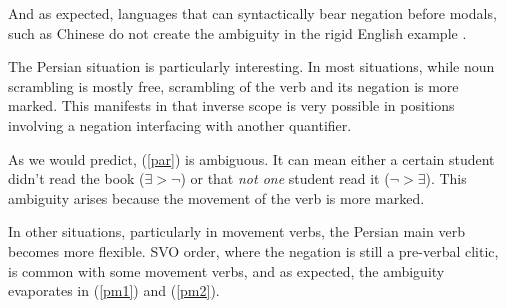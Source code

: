 \documentclass{article}
\begin{document}
And as expected, languages that can syntactically bear negation before modals, such as Chinese do not create the ambiguity in the rigid English example \parencite{ernst98}.

\begin{exe}
\end{exe}

The Persian situation is particularly interesting. In most situations, while noun scrambling is mostly free, scrambling of the verb and its negation is more marked. This manifests in that inverse scope is very possible in positions involving a negation interfacing with another quantifier.

\begin{exe}
\end{exe}

As we would predict, (\ref{par}) is ambiguous. It can mean either a certain student didn't read the book ($\exists > \neg$) or that \emph{not one} student read it ($\neg > \exists$). This ambiguity arises because the movement of the verb is more marked.

In other situations, particularly in movement verbs, the Persian main verb becomes more flexible. SVO order, where the negation is still a pre-verbal clitic, is common with some movement verbs, and as expected, the ambiguity evaporates in (\ref{pm1}) and (\ref{pm2}).

\begin{exe}
\end{exe}
\end{document}
